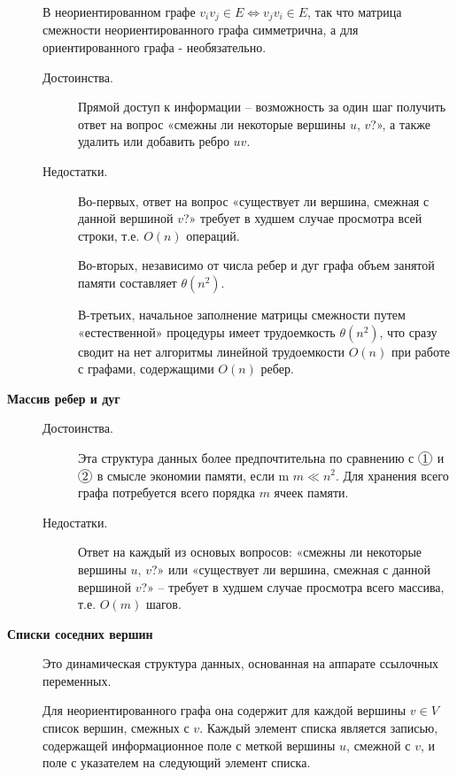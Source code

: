 \begin{note}
\begin{description}
              В неориентированном графе $ v_iv_j \in E \iff v_jv_i \in E $, так что матрица смежности неориентированного графа симметрична, а для ориентированного графа - необязательно.
              \begin{description}
                  \item[Достоинства.] Прямой доступ к информации – возможность за один шаг получить ответ на вопрос «смежны ли некоторые вершины $ u $, $ v $?», а также удалить или добавить ребро $ uv $.
                  \item[Недостатки.]
                        Во-первых, ответ на вопрос «существует ли вершина, смежная с данной вершиной $ v $?» требует в худшем случае просмотра всей строки, т.е. $ O(n) $ операций.

                        Во-вторых, независимо от числа ребер и дуг графа объем занятой памяти составляет $ \theta(n^2) $.

                        В-третьих, начальное заполнение матрицы смежности путем «естественной» процедуры имеет трудоемкость $ \theta(n^2) $, что сразу сводит на нет алгоритмы линейной трудоемкости $ O(n) $ при работе с графами, содержащими $ O(n) $ ребер.
              \end{description}

        \item[\circled{3} \textbf{Массив ребер и дуг}]\leavevmode
              \begin{description}
                  \item[Достоинства.] Эта структура данных более предпочтительна по сравнению с $\circled{1}$ и $\circled{2}$ в смысле экономии памяти, если m $m \ll n^2 $. Для хранения всего графа потребуется всего порядка $ m $ ячеек памяти.
                  \item[Недостатки.] Ответ на каждый из основых вопросов: «смежны ли некоторые вершины $ u $, $ v $?» или «существует ли вершина, смежная с данной вершиной $ v $?» – требует в худшем случае просмотра всего массива, т.е. $ O(m) $ шагов.
              \end{description}

        \item[\circled{4} \textbf{Списки соседних вершин}]
              Это динамическая структура данных, основанная на аппарате ссылочных переменных.

              Для неориентированного графа она содержит для каждой вершины $ v \in V $ список вершин, смежных с $ v $. Каждый элемент списка является записью, содержащей информационное поле с меткой вершины $ u $, смежной с $ v $, и поле с указателем на следующий элемент списка.


\end{description}
\end{note}
